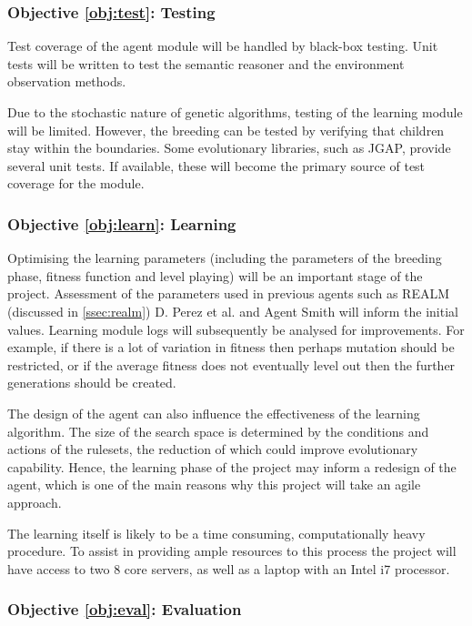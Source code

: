 \subsubsection*{Objective \ref{obj:test}: Testing}
\label{meth:test}

Test coverage of the agent module will be handled by black-box testing. Unit tests will be written to test the semantic reasoner and the environment observation methods.

Due to the stochastic nature of genetic algorithms, testing of the learning module will be limited. However, the breeding can be tested by verifying that children stay within the boundaries. Some evolutionary libraries, such as JGAP, provide several unit tests. If available, these will become the primary source of test coverage for the module.

\subsubsection*{Objective \ref{obj:learn}: Learning}
\label{meth:learn}

Optimising the learning parameters (including the parameters of the breeding phase, fitness function and level playing) will be an important stage of the project. Assessment of the parameters used in previous agents such as REALM (discussed in \ref{ssec:realm}) D. Perez et al. \cite{gramev} and Agent Smith \cite{agentsmith} will inform the initial values. Learning module logs will subsequently be analysed for improvements. For example, if there is a lot of variation in fitness then perhaps mutation should be restricted, or if the average fitness does not eventually level out then the further generations should be created.

The design of the agent can also influence the effectiveness of the learning algorithm. The size of the search space is determined by the conditions and actions of the rulesets, the reduction of which could improve evolutionary capability. Hence, the learning phase of the project may inform a redesign of the agent, which is one of the main reasons why this project will take an agile approach.

The learning itself is likely to be a time consuming, computationally heavy procedure. To assist in providing ample resources to this process the project will have access to two 8 core servers, as well as a laptop with an Intel i7 processor.

\subsubsection*{Objective \ref{obj:eval}: Evaluation}
\label{meth:eval}

